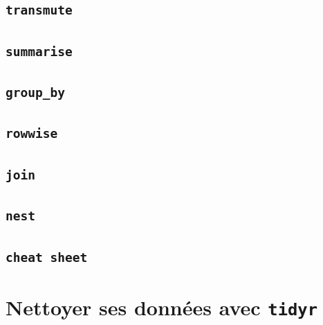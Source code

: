 \documentclass[
  letterpaper,
  DIV=11,
  numbers=noendperiod]{scrreprt}
\begin{document}
\hypertarget{transmute}{%
\section{\texorpdfstring{\texttt{transmute}}{transmute}}\label{transmute}}

\hypertarget{summarise}{%
\section{\texorpdfstring{\texttt{summarise}}{summarise}}\label{summarise}}

\hypertarget{group_by}{%
\section{\texorpdfstring{\texttt{group\_by}}{group\_by}}\label{group_by}}

\hypertarget{rowwise}{%
\section{\texorpdfstring{\texttt{rowwise}}{rowwise}}\label{rowwise}}

\hypertarget{join}{%
\section{\texorpdfstring{\texttt{join}}{join}}\label{join}}

\hypertarget{nest}{%
\section{\texorpdfstring{\texttt{nest}}{nest}}\label{nest}}

\hypertarget{cheat-sheet}{%
\section{\texorpdfstring{\texttt{cheat\ sheet}}{cheat sheet}}\label{cheat-sheet}}


\hypertarget{nettoyer-ses-donnuxe9es-avec-tidyr}{%
\chapter{\texorpdfstring{Nettoyer ses données avec
\texttt{tidyr}}{Nettoyer ses données avec tidyr}}\label{nettoyer-ses-donnuxe9es-avec-tidyr}}

\end{document}
